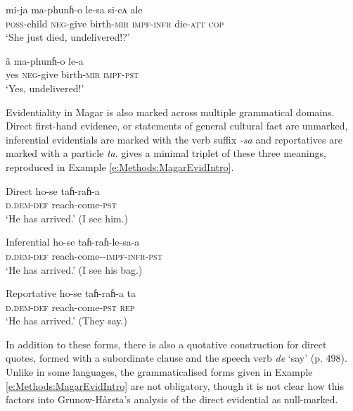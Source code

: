 \begin{exe}
  \ex \label{e:Methods:MagarMirativeAddOri}
  \begin{xlist}
    \ex \label{e:Methods:MagarMirativeAddOri:q}
    \gll mi-ja ma-phunɦ-o le-sa si-cʌ ale \\
    \textsc{poss}-child \textsc{neg}-{give birth}-\textsc{mir} \textsc{impf-infr} die-\textsc{att} \textsc{cop} \\
    \glt `She just died, undelivered!?'

    \ex \label{e:Methods:MagarMirativeAddOri:a}
    \gll ã ma-phunɦ-o le-a \\
    yes \textsc{neg}-{give birth}-\textsc{mir} \textsc{impf-pst} \\
    \glt `Yes, undelivered!'
  \end{xlist}
  \cite[Magar,][487]{GrunowHarsta2008}
\end{exe}

Evidentiality in Magar is also marked across multiple grammatical domains. Direct first-hand evidence, or statements of general cultural fact are unmarked, inferential evidentials are marked with the verb suffix \textit{-sa} and reportatives are marked with a particle \textit{ta}.  gives a minimal triplet of these three meanings, reproduced in Example \ref{e:Methods:MagarEvidIntro}.

\begin{exe}
  \ex \label{e:Methods:MagarEvidIntro}
  \begin{xlist}
    \ex Direct
    \gll ho-se taɦ-raɦ-a \\
    \textsc{d.dem-def} reach-come-\textsc{pst} \\
    \glt `He has arrived.' (I see him.)

    \ex Inferential
    \gll ho-se taɦ-raɦ-le-sa-a \\
    \textsc{d.dem-def} reach-come-\textsc{-impf-infr-pst} \\
    \glt `He has arrived.' (I see his bag.)

    \ex Reportative
    \gll ho-se taɦ-raɦ-a ta \\
    \textsc{d.dem-def} reach-come-\textsc{pst} \textsc{rep} \\
    \glt `He has arrived.' (They say.)
  \end{xlist}
  \cite[Magar,][497]{GrunowHarsta2008}
\end{exe}

In addition to these forms, there is also a quotative construction for direct quotes, formed with a subordinate clause and the speech verb \textit{de} `say' (p. 498). Unlike in some languages, the grammaticalised forms given in Example \ref{e:Methods:MagarEvidIntro} are not obligatory, though it is not clear how this factors into Grunow-Hårsta's analysis of the direct evidential as null-marked.

